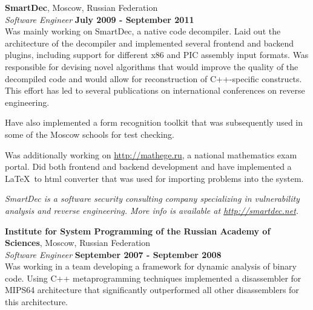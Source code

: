 \documentclass[margin,line]{CV}
\begin{document}
\begin{resume}

    
    
    \textbf{SmartDec}, Moscow, Russian Federation \vspace{2mm}\\\vspace{1mm}%
    \textsl{Software Engineer} \hfill \textbf{July 2009 - September 2011}\\
    Was mainly working on SmartDec, a native code decompiler. Laid out the architecture of the decompiler and implemented several frontend and backend plugins, including support for different x86 and PIC assembly input formats. Was responsible for devising novel algorithms that would improve the quality of the decompiled code and would allow for reconstruction of C++-specific constructs. This effort has led to several publications on international conferences on reverse engineering.

    Have also implemented a form recognition toolkit that was subsequently used in some of the Moscow schools for test checking. 

    Was additionally working on \url{http://mathege.ru}, a national mathematics exam portal. Did both frontend and backend development and have implemented a \LaTeX~to html converter that was used for importing problems into the system.

\ifdefined\superofficial
    {\footnotesize\textit{SmartDec is a software security consulting company specializing in vulnerability analysis and reverse engineering. More info is available at \url{http://smartdec.net}.}}
\fi
    
    
    \textbf{Institute for System Programming of the Russian Academy of Sciences}, Moscow, Russian Federation \vspace{2mm}\\\vspace{1mm}%
    \textsl{Software Engineer} \hfill \textbf{September 2007 - September 2008}\\
    Was working in a team developing a framework for dynamic analysis of binary code. Using C++ metaprogramming techniques implemented a disassembler for MIPS64 architecture that significantly outperformed all other disassemblers for this architecture.


\end{resume}
\end{document}
